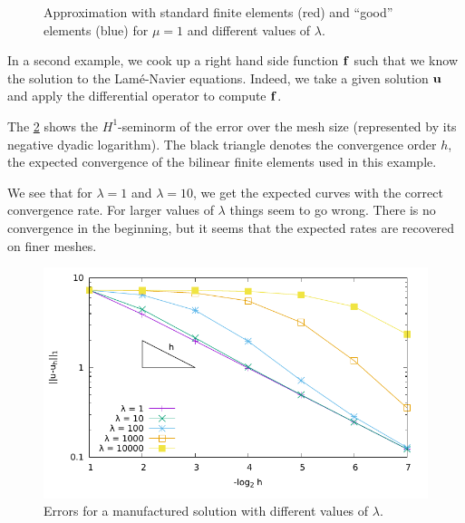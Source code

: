 \begin{figure}[tp]
  \caption{Approximation with standard finite elements (red) and
    ``good'' elements (blue) for $\mu=1$ and different values of
    $\lambda$.}
  \label{fig:elasticity-compressibility}
\end{figure}

\begin{example}
  In a second example, we cook up a right hand side function $\mathbf f$
  such that we know the solution to the Lamé-Navier equations. Indeed,
  we take a given solution $\mathbf u$ and apply the differential operator
  to compute $\mathbf f$.

  The \cref{fig:elasticity-locking} shows the $H^1$-seminorm of the
  error over the mesh size (represented by its negative dyadic
  logarithm). The black triangle denotes the convergence order $h$,
  the expected convergence of the bilinear finite elements used in
  this example.

  We see that for $\lambda=1$ and $\lambda=10$, we get the expected
  curves with the correct convergence rate. For larger values of
  $\lambda$ things seem to go wrong. There is no convergence in the
  beginning, but it seems that the expected rates are recovered on
  finer meshes.
\end{example}

\begin{figure}[tp]
  \centering
  \includegraphics[width=.9\textwidth]{mixed/graph/elasticity/locking}
  \caption{Errors for a manufactured solution with different values of $\lambda$.}
  \label{fig:elasticity-locking}
\end{figure}

